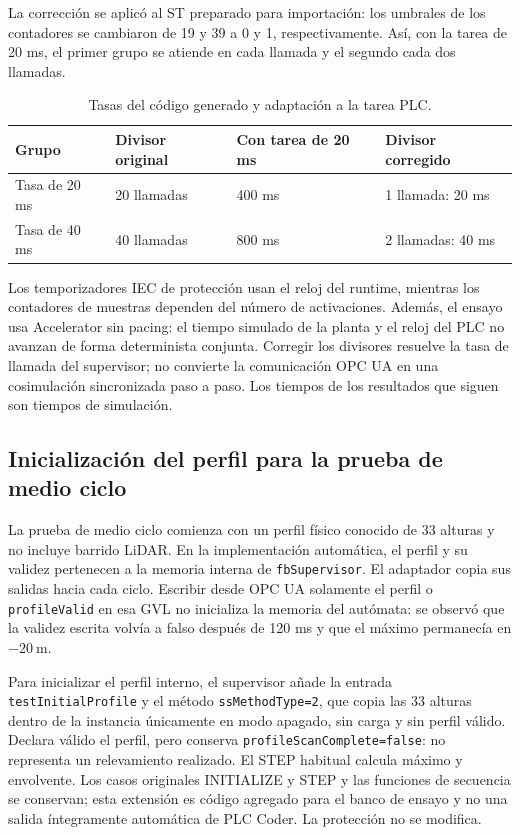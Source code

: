 \documentclass[a4paper,10pt,onecolumn,journal]{ieeeconf}
\numberwithin{equation}{section}
\begin{document}
La corrección se aplicó al ST preparado para importación: los umbrales de los contadores se cambiaron de 19 y 39 a 0 y 1, respectivamente. Así, con la tarea de 20 ms, el primer grupo se atiende en cada llamada y el segundo cada dos llamadas.

\begin{table}[!htbp]
\centering\small
\caption{Tasas del código generado y adaptación a la tarea PLC.}\label{tab:tasas_plc_coder}
\begin{tabular}{L{4.3cm} C{3.1cm} C{3.1cm} C{3.1cm}}
\toprule
Grupo & Divisor original & Con tarea de 20 ms & Divisor corregido\\
\midrule
Tasa de 20 ms & 20 llamadas & 400 ms & 1 llamada: 20 ms\\
Tasa de 40 ms & 40 llamadas & 800 ms & 2 llamadas: 40 ms\\
\bottomrule
\end{tabular}
\end{table}

Los temporizadores IEC de protección usan el reloj del runtime, mientras los contadores de muestras dependen del número de activaciones. Además, el ensayo usa Accelerator sin pacing: el tiempo simulado de la planta y el reloj del PLC no avanzan de forma determinista conjunta. Corregir los divisores resuelve la tasa de llamada del supervisor; no convierte la comunicación OPC UA en una cosimulación sincronizada paso a paso. Los tiempos de los resultados que siguen son tiempos de simulación.

\subsection{Inicialización del perfil para la prueba de medio ciclo}
La prueba de medio ciclo comienza con un perfil físico conocido de 33 alturas y no incluye barrido LiDAR. En la implementación automática, el perfil y su validez pertenecen a la memoria interna de \texttt{fbSupervisor}. El adaptador copia sus salidas hacia  cada ciclo. Escribir desde OPC UA solamente el perfil o \texttt{profileValid} en esa GVL no inicializa la memoria del autómata: se observó que la validez escrita volvía a falso después de 120 ms y que el máximo permanecía en $-20~\mathrm{m}$.

Para inicializar el perfil interno, el supervisor añade la entrada \texttt{testInitialProfile} y el método \texttt{ssMethodType=2}, que copia las 33 alturas dentro de la instancia únicamente en modo apagado, sin carga y sin perfil válido. Declara válido el perfil, pero conserva \texttt{profileScanComplete=false}: no representa un relevamiento realizado. El STEP habitual calcula máximo y envolvente. Los casos originales INITIALIZE y STEP y las funciones de secuencia se conservan; esta extensión es código agregado para el banco de ensayo y no una salida íntegramente automática de PLC Coder. La protección no se modifica.
\end{document}
